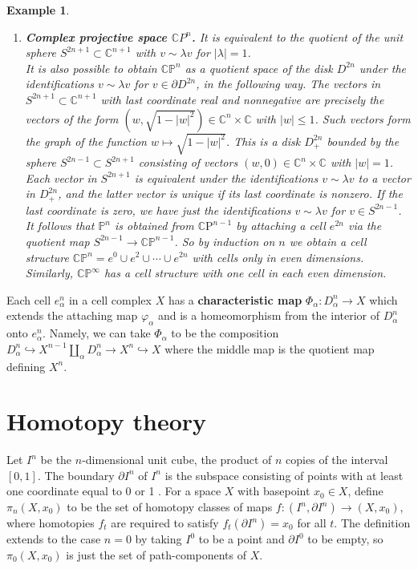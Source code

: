 \documentclass{book}
\newtheorem{example}{Example}
\begin{document}
\begin{example}
\begin{enumerate}
        \item \textbf{Complex projective space $\mathbb{C} P^n$.} It is equivalent to the quotient of the unit sphere $S^{2 n+1} \subset \mathbb{C}^{n+1}$ with $v \sim \lambda v$ for $|\lambda|=1$. \\
        It is also possible to obtain $\mathbb{C P}^n$ as a quotient space of the disk $D^{2 n}$ under the identifications $v \sim \lambda v$ for $v \in \partial D^{2 n}$, in the following way. The vectors in $S^{2 n+1} \subset \mathbb{C}^{n+1}$ with last coordinate real and nonnegative are precisely the vectors of the form $\left(w, \sqrt{1-|w|^2}\right) \in \mathbb{C}^n \times \mathbb{C}$ with $|w| \leq 1$. Such vectors form the graph of the function $w \mapsto \sqrt{1-|w|^2}$. This is a disk $D_{+}^{2 n}$ bounded by the sphere $S^{2 n-1} \subset S^{2 n+1}$ consisting of vectors $(w, 0) \in \mathbb{C}^n \times \mathbb{C}$ with $|w|=1$. Each vector in $S^{2 n+1}$ is equivalent under the identifications $v \sim \lambda v$ to a vector in $D_{+}^{2 n}$, and the latter vector is unique if its last coordinate is nonzero. If the last coordinate is zero, we have just the identifications $v \sim \lambda v$ for $v \in S^{2 n-1}$.\\
        It follows that $\mathbb{P}^n$ is obtained from $\mathbb{C} \mathrm{P}^{n-1}$ by attaching a cell $e^{2 n}$ via the quotient map $S^{2 n-1} \rightarrow \mathbb{C P}^{n-1}$. So by induction on $n$ we obtain a cell structure $\mathbb{C P}^n=e^0 \cup e^2 \cup \cdots \cup e^{2 n}$ with cells only in even dimensions. Similarly, $\mathbb{C P}^{\infty}$ has a cell structure with one cell in each even dimension.
    \end{enumerate}
\end{example}

Each cell $e_\alpha^n$ in a cell complex $X$ has a \textbf{characteristic map} $\Phi_\alpha: D_\alpha^n \rightarrow X$ which extends the attaching map $\varphi_\alpha$ and is a homeomorphism from the interior of $D_\alpha^n$ onto $e_\alpha^n$. Namely, we can take $\Phi_\alpha$ to be the composition $D_\alpha^n \hookrightarrow X^{n-1} \coprod_\alpha D_\alpha^n \rightarrow X^n \hookrightarrow X$ where the middle map is the quotient map defining $X^n$. 

\chapter{Homotopy theory}

Let $I^n$ be the $n$-dimensional unit cube, the product of $n$ copies of the interval $[0,1]$. The boundary $\partial I^n$ of $I^n$ is the subspace consisting of points with at least one coordinate equal to 0 or 1 . For a space $X$ with basepoint $x_0 \in X$, define $\pi_n\left(X, x_0\right)$ to be the set of homotopy classes of maps $f:\left(I^n, \partial I^n\right) \rightarrow\left(X, x_0\right)$, where homotopies $f_t$ are required to satisfy $f_t\left(\partial I^n\right)=x_0$ for all $t$. The definition extends to the case $n=0$ by taking $I^0$ to be a point and $\partial I^0$ to be empty, so $\pi_0\left(X, x_0\right)$ is just the set of path-components of $X$.
\end{document}
